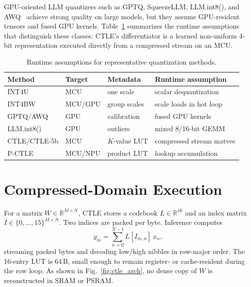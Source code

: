 \documentclass[10pt,journal]{IEEEtran}
\begin{document}
GPU-oriented LLM quantizers such as GPTQ, SqueezeLLM, LLM.int8(), and
AWQ~\cite{frantar2023gptq,kim2024squeezellm,dettmers2022llmint8,lin2024awq}
achieve strong quality on large models, but they assume GPU-resident tensors and
fused GPU kernels. Table~\ref{tab:scope_esl} summarizes the runtime assumptions
that distinguish these classes: CTLE's differentiator is a learned non-uniform
4-bit representation executed directly from a compressed stream on an MCU.

\begin{table}[t]
\centering
\footnotesize
\caption{Runtime assumptions for representative quantization methods.}
\label{tab:scope_esl}
\setlength{\tabcolsep}{3pt}
\renewcommand{\arraystretch}{1.12}
\begin{tabular}{llll}
\hline
Method & Target & Metadata & Runtime assumption \\
\hline
INT4U & MCU & one scale & scalar dequantization \\
INT4BW & MCU/GPU & group scales & scale loads in hot loop \\
GPTQ/AWQ & GPU & calibration & fused GPU kernels \\
LLM.int8() & GPU & outliers & mixed 8/16-bit GEMM \\
CTLE/CTLE-5b & MCU & $K$-value LUT & compressed stream matvec \\
P-CTLE & MCU/NPU & product LUT & lookup accumulation \\
\hline
\end{tabular}
\end{table}


\section{Compressed-Domain Execution}

For a matrix $W\in\mathbb{R}^{M\times N}$, CTLE stores a codebook
$L\in\mathbb{R}^{16}$ and an index matrix $I\in\{0,\ldots,15\}^{M\times N}$.
Two indices are packed per byte. Inference computes
\begin{equation}
 y_m = \sum_{n=0}^{N-1} L[I_{m,n}]\, x_n ,
\end{equation}
streaming packed bytes and decoding low/high nibbles in row-major order.
The 16-entry LUT is 64\,B, small enough to remain register- or cache-resident
during the row loop. As shown in Fig.~\ref{fig:ctle_arch}, no dense copy of $W$
is reconstructed in SRAM or PSRAM.
\end{document}
